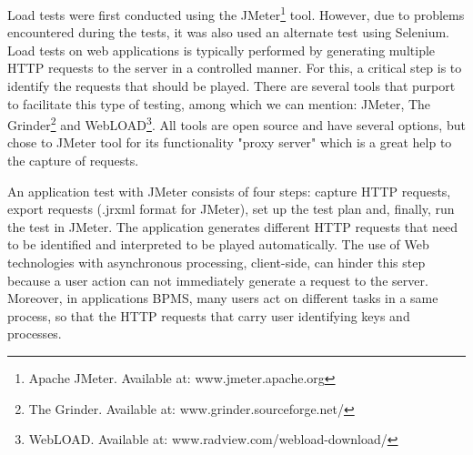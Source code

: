 \documentclass[runningheads,a4paper]{llncs}
\begin{document}
Load tests were first conducted using the JMeter\footnote{Apache JMeter. Available at: www.jmeter.apache.org} tool. However, due to problems encountered during the tests, it was also used an alternate test using Selenium.
Load tests on web applications is typically performed by generating multiple HTTP requests to the server in a controlled manner. For this, a critical step is to identify the requests that should be played. There are several tools that purport to facilitate this type of testing, among which we can mention: JMeter, The Grinder\footnote{The Grinder. Available at: www.grinder.sourceforge.net/} and WebLOAD\footnote{WebLOAD. Available at: www.radview.com/webload-download/}. All tools are open source and have several options, but chose to JMeter tool for its functionality "proxy server" which is a great help to the capture of requests.

An application test with JMeter consists of four steps: capture HTTP requests, export requests (.jrxml format for JMeter), set up the test plan and, finally, run the test in JMeter. The application generates different HTTP requests that need to be identified and interpreted to be played automatically. The use of Web technologies with asynchronous processing, client-side, can hinder this step because a user action can not immediately generate a request to the server. Moreover, in applications BPMS, many users act on different tasks in a same process, so that the HTTP requests that carry user identifying keys and processes.
\end{document}
